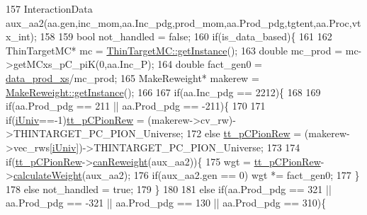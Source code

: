 \begin{DoxyCode}
157     InteractionData aux\_aa2(aa.gen,inc\_mom,aa.Inc\_pdg,prod\_mom,aa.Prod\_pdg,tgtent,aa.Proc,vtx\_int);
158     
159     \textcolor{keywordtype}{bool} not\_handled = \textcolor{keyword}{false};
160     \textcolor{keywordflow}{if}(is\_data\_based)\{
161       
162       ThinTargetMC*  mc =  \hyperlink{class_neutrino_flux_reweight_1_1_thin_target_m_c_a2a114747fed2677cd3b7213555c002b9}{ThinTargetMC::getInstance}(); 
163       \textcolor{keywordtype}{double} mc\_prod   = mc->getMCxs\_pC\_piK(0,aa.Inc\_P);
164       \textcolor{keywordtype}{double} fact\_gen0 = \hyperlink{class_neutrino_flux_reweight_1_1_thin_targetnucleon_a_reweighter_a47e99efcf073246a61f4a5bd4db3574e}{data\_prod\_xs}/mc\_prod;
165       MakeReweight*  makerew =  \hyperlink{class_neutrino_flux_reweight_1_1_make_reweight_a42d1fa92a1e30bd80538188e0c9d8b4a}{MakeReweight::getInstance}();
166 
167       \textcolor{keywordflow}{if}(aa.Inc\_pdg == 2212)\{
168 
169         \textcolor{keywordflow}{if}(aa.Prod\_pdg == 211 || aa.Prod\_pdg == -211)\{
170 
171           \textcolor{keywordflow}{if}(\hyperlink{class_neutrino_flux_reweight_1_1_thin_targetnucleon_a_reweighter_a546b2c322fe357472e17a4a901bd2212}{iUniv}==-1)\hyperlink{class_neutrino_flux_reweight_1_1_thin_targetnucleon_a_reweighter_a0a172e21c2229793a1cc8c02bd91a10c}{tt\_pCPionRew} = (makerew->cv\_rw)->THINTARGET\_PC\_PION\_Universe;
172           \textcolor{keywordflow}{else} \hyperlink{class_neutrino_flux_reweight_1_1_thin_targetnucleon_a_reweighter_a0a172e21c2229793a1cc8c02bd91a10c}{tt\_pCPionRew} = (makerew->vec\_rws[\hyperlink{class_neutrino_flux_reweight_1_1_thin_targetnucleon_a_reweighter_a546b2c322fe357472e17a4a901bd2212}{iUniv}])->THINTARGET\_PC\_PION\_Universe;    
173           
174           \textcolor{keywordflow}{if}(\hyperlink{class_neutrino_flux_reweight_1_1_thin_targetnucleon_a_reweighter_a0a172e21c2229793a1cc8c02bd91a10c}{tt\_pCPionRew}->\hyperlink{class_neutrino_flux_reweight_1_1_thin_targetp_c_pion_reweighter_a09067dcacb294ca133e2660d61302e85}{canReweight}(aux\_aa2))\{
175             wgt = \hyperlink{class_neutrino_flux_reweight_1_1_thin_targetnucleon_a_reweighter_a0a172e21c2229793a1cc8c02bd91a10c}{tt\_pCPionRew}->\hyperlink{class_neutrino_flux_reweight_1_1_thin_targetp_c_pion_reweighter_ab797bbeeedb04cda73feef891434cd5f}{calculateWeight}(aux\_aa2);
176             \textcolor{keywordflow}{if}(aux\_aa2.gen == 0) wgt *= fact\_gen0;
177           \}
178           \textcolor{keywordflow}{else} not\_handled = \textcolor{keyword}{true};
179         \}      
180 
181         \textcolor{keywordflow}{else} \textcolor{keywordflow}{if}(aa.Prod\_pdg == 321 || aa.Prod\_pdg == -321 || aa.Prod\_pdg == 130 || aa.Prod\_pdg == 310)\{

\end{DoxyCode}
